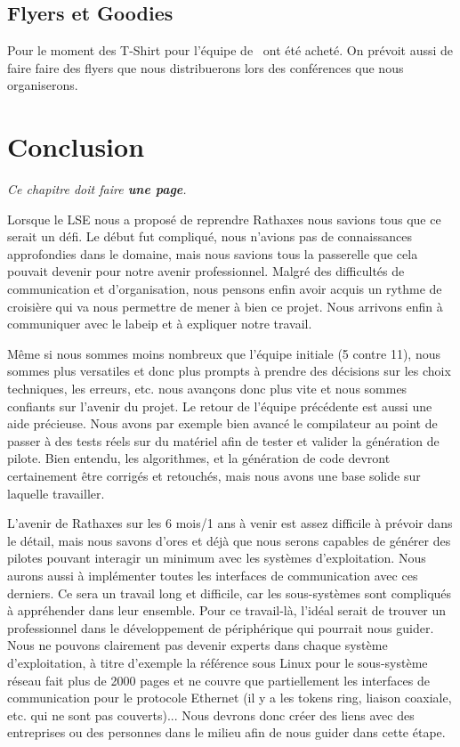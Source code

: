 \documentclass[francais]{rtxreport}
\begin{document}

\section{Flyers et Goodies}

Pour le moment des T-Shirt pour l'équipe de \rtx\ ont été acheté. On prévoit
aussi de faire faire des flyers que nous distribuerons lors des conférences que
nous organiserons.

\chapter{Conclusion}

\emph{Ce chapitre doit faire \textbf{une page}.}


Lorsque le LSE nous a proposé de reprendre Rathaxes nous savions tous que ce
serait un défi. Le début fut compliqué, nous n’avions pas de connaissances
approfondies dans le domaine, mais nous savions tous la passerelle que cela
pouvait devenir pour notre avenir professionnel. Malgré des difficultés de
communication et d’organisation, nous pensons enfin avoir acquis un rythme de
croisière qui va nous permettre de mener à bien ce projet. Nous arrivons enfin
à communiquer avec le labeip et à expliquer notre travail.

Même si nous sommes moins nombreux que l’équipe initiale (5 contre 11), nous
sommes plus versatiles et donc plus prompts à prendre des décisions sur les
choix techniques, les erreurs, etc. nous avançons donc plus vite et nous sommes
confiants sur l’avenir du projet. Le retour de l'équipe précédente est aussi
une aide précieuse.  Nous avons par exemple bien avancé le compilateur au point
de passer à des tests réels sur du matériel afin de tester et valider la
génération de pilote.  Bien entendu, les algorithmes, et la génération de code
devront certainement être corrigés et retouchés, mais nous avons une base
solide sur laquelle travailler.

L’avenir de Rathaxes sur les 6 mois/1 ans à venir est assez difficile à prévoir
dans le détail, mais nous savons d’ores et déjà que nous serons capables de
générer des pilotes pouvant interagir un minimum avec les systèmes
d’exploitation. Nous aurons aussi à implémenter toutes les interfaces de
communication avec ces derniers. Ce sera un travail long et difficile, car les
sous-systèmes sont compliqués à appréhender dans leur ensemble. Pour ce
travail-là, l’idéal serait de trouver un professionnel dans le développement de
périphérique qui pourrait nous guider. Nous ne pouvons clairement pas devenir
experts dans chaque système d’exploitation, à titre d’exemple la référence sous
Linux pour le sous-système réseau fait plus de 2000 pages et ne couvre que
partiellement les interfaces de communication pour le protocole Ethernet (il y
a les tokens ring, liaison coaxiale, etc. qui ne sont pas couverts)...  Nous
devrons donc créer des liens avec des entreprises ou des personnes dans le
milieu afin de nous guider dans cette étape.
\end{document}
